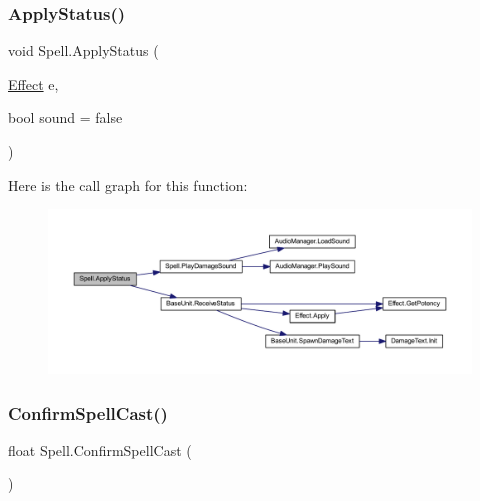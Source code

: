 \subsubsection{\texorpdfstring{ApplyStatus()}{ApplyStatus()}}
{\footnotesize\ttfamily void Spell.\+Apply\+Status (\begin{DoxyParamCaption}\item[{\mbox{\hyperlink{class_effect}{Effect}}}]{e,  }\item[{bool}]{sound = {\ttfamily false} }\end{DoxyParamCaption})}

Here is the call graph for this function\+:
\nopagebreak
\begin{figure}[H]
\begin{center}
\leavevmode
\includegraphics[width=350pt]{class_spell_aa020942716a6504fc6b23351a4baa3b6_cgraph}
\end{center}
\end{figure}
\mbox{\label{class_spell_a89146285dc4dadf46398da2683bcc869}} 
\subsubsection{\texorpdfstring{ConfirmSpellCast()}{ConfirmSpellCast()}}
{\footnotesize\ttfamily float Spell.\+Confirm\+Spell\+Cast (\begin{DoxyParamCaption}{ }\end{DoxyParamCaption})}

